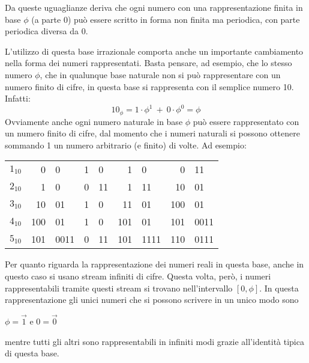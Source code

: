 \documentclass[Lau,oneside]{sapthesis}
\begin{document}
Da queste uguaglianze deriva che ogni numero con una rappresentazione finita in base $\phi$ (a parte 0) può essere scritto in forma non finita ma periodica, con parte periodica diversa da 0.

\medskip

L'utilizzo di questa base irrazionale comporta anche un importante cambiamento nella forma dei numeri rappresentati. Basta pensare, ad esempio, che lo stesso numero $\phi$, che in qualunque base naturale non si può rappresentare con un numero finito di cifre, in questa base si rappresenta con il semplice numero 10. Infatti:
$$10_\phi = 1 \cdot \phi^1 \ + \ 0 \cdot \phi^0 = \phi$$
Ovviamente anche ogni numero naturale in base $\phi$ può essere rappresentato con un numero finito di cifre, dal momento che i numeri naturali si possono ottenere sommando 1 un numero arbitrario (e finito) di volte. Ad esempio:
\begin{center}
\begin{tabular}{c@{ = }r@{.}l@{ + }r@{.}l@{ = }r@{.}l@{ = }r@{.}l}
$1_{10}$ & 0 & 0 & 1 & 0 & 1 & 0 & 0 & 11\\
$2_{10}$ & 1 & 0 & 0 & 11 & 1 & 11 & 10 & 01\\
$3_{10}$ & 10 & 01 & 1 & 0 & 11 & 01 & 100 & 01\\
$4_{10}$ & 100 & 01 & 1 & 0 & 101 & 01 & 101 & 0011\\
$5_{10}$ & 101 & 0011 & 0 & 11 & 101 & 1111 & 110 & 0111
\end{tabular}
\end{center}

\medskip

Per quanto riguarda la rappresentazione dei numeri reali in questa base, anche in questo caso si usano stream infiniti di cifre. Questa volta, però, i numeri rappresentabili tramite questi stream si trovano nell'intervallo $\left[0,\phi\right]$. In questa rappresentazione gli unici numeri che si possono scrivere in un unico modo sono
\begin{center}
$\phi = \overrightarrow{1}$ \hspace{0.5cm} e \hspace{0.5cm} $0 = \overrightarrow{0}$
\end{center}
mentre tutti gli altri sono rappresentabili in infiniti modi grazie all'identità tipica di questa base.
\end{document}
